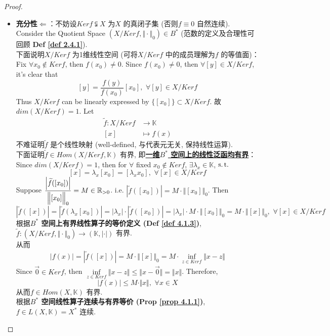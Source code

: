 \begin{proposition}
\begin{proof}
\begin{itemize}
				\item \textbf{充分性$\Leftarrow$}：不妨设$Ker f \subsetneqq X$ 为$X$ 的真闭子集 (否则$f \equiv 0$ 自然连续). \\
				Consider the Quotient Space $(X / Ker f , \Vert \cdot \Vert_0) \in B^*$ (范数的定义及合理性可回顾 \textbf{Def \ref{def 2.4.1}}). \\
				下面说明$X / Ker f$ 为1维线性空间 (可将$X / Ker f$ 中的成员理解为$f$ 的等值面)：\\
				Fix $\forall x_0 \not\in Kerf$, then $f(x_0) \neq 0$. Since $f(x_0) \neq 0$, then $\forall [y] \in X / Ker f$, it's clear that
				\[ [y] = \frac{f(y)}{f(x_0)} [x_0] , \,\, \forall [y] \in X / Ker f \]
				Thus $X / Ker f$ can be linearly expressed by $\{ [x_0] \} \subset X / Ker f$. 故$dim(X / Ker f) = 1$. Let
				\begin{align*}
					\widetilde{f} : X / Ker f &\longrightarrow \mathbb{K} \\
					[x] &\longmapsto f(x)
				\end{align*}
				不难证明$\widetilde{f}$ 是个线性映射 (well-defined, 与代表元无关, 保持线性运算). \\
				下面证明$\widetilde{f} \in Hom(X / Ker f , \mathbb{K})$ 有界, 即\underline{\textbf{一维$B^*$ 空间上的线性泛函均有界}}：\\
				Since $dim(X / Ker f) = 1$, then for $\forall$ fixed $x_0 \not\in Ker f$, $\exists \lambda_x \in \mathbb{K}$, $\operatorname{s.t.}$
				\[ [x] = \lambda_x [x_0] = [\lambda_x x_0] , \,\, \forall [x] \in X / Ker f \]
				Suppose $\dfrac{\left| \widetilde{f}([x_0]) \right|}{\Big\Vert [x_0] \Big\Vert_0} = M \in \mathbb{R}_{> 0}$. i.e. $\left| \widetilde{f}([x_0]) \right| = M \cdot \Big\Vert [x_0] \Big\Vert_0$. Then 
				\[ \left| \widetilde{f}([x]) \right| 
				= \left| \widetilde{f}(\lambda_x [x_0]) \right| 
				= \left| \lambda_x \right| \cdot \left| \widetilde{f}([x_0]) \right| 
				= \left| \lambda_x \right| \cdot M \cdot \Big\Vert [x_0] \Big\Vert_0 
				= M \cdot \Big\Vert [x] \Big\Vert_0 , \,\, \forall [x] \in X / Ker f \]
				根据\textbf{$B^*$ 空间上有界线性算子的等价定义 (Def \ref{def 4.1.3})}, $\widetilde{f} : (X / Ker f , \Vert \cdot \Vert_0) \longrightarrow (\mathbb{K} , | \cdot |)$ 有界. \\
				从而
				\begin{align*}
					\left| f(x) \right| 
					= \left| \widetilde{f}([x]) \right| 
					= M \cdot \Big\Vert [x] \Big\Vert_0 
					= M \cdot \inf_{z \in Ker f} \Vert x - z \Vert
				\end{align*}
				Since $\overrightarrow{0} \in Ker f$, then $\underset{z \in Ker f}{\inf} \Vert x - z \Vert \leq \Vert x - \overrightarrow{0} \Vert = \Vert x \Vert$. Therefore, 
				\[ \left| f(x) \right| \leq M \cdot \Vert x \Vert , \,\, \forall x \in X \]
				从而$f \in Hom(X , \mathbb{K})$ 有界. \\
				根据\textbf{$B^*$ 空间线性算子连续与有界等价 (Prop \ref{prop 4.1.1})}, $f \in L(X , \mathbb{K}) = X^*$ 连续. 
			\end{itemize}
		\end{proof}
	\end{proposition} 

